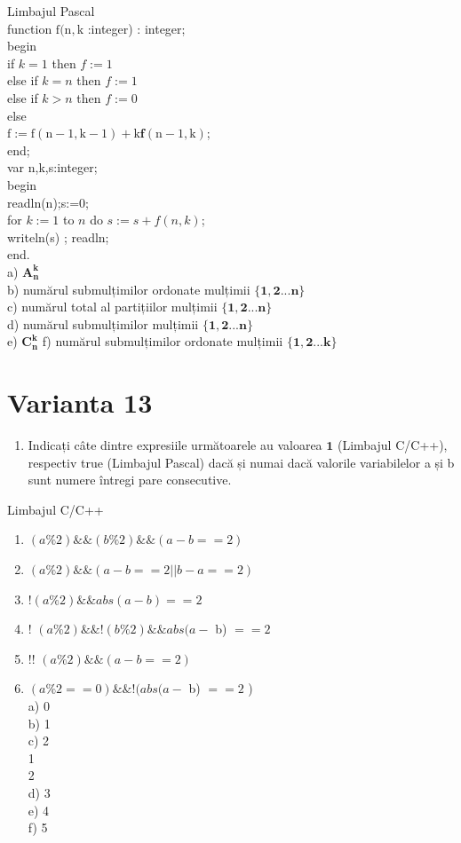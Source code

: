 \documentclass[10pt]{article}
\begin{document}
Limbajul Pascal\\
function $\mathrm{f}(\mathrm{n}, \mathrm{k}$ :integer) : integer;\\
begin\\
if $k=1$ then $f:=1$\\
else if $k=n$ then $f:=1$\\
else if $k>n$ then $f:=0$\\
else\\
$\mathrm{f}:=\mathrm{f}(\mathrm{n}-1, \mathrm{k}-1)+\mathrm{k} \boldsymbol{f}(\mathrm{n}-1, \mathrm{k})$;\\
end;\\
var n,k,s:integer;\\
begin\\
readln(n);s:=0;\\
for $k:=1$ to $n$ do $s:=s+f(n, k)$;\\
writeln(s) ; readln;\\
end.\\
a) $\boldsymbol{A}_{\boldsymbol{n}}^{\boldsymbol{k}}$\\
b) numărul submulțimilor ordonate mulțimii $\{\mathbf{1 , 2 . . . n \}}$\\
c) numărul total al partițiilor mulțimii $\{\mathbf{1 , 2 . . . \mathbf { n } \}}$\\
d) numărul submulțimilor mulțimii $\{\mathbf{1 , 2} . . . \mathbf{n}\}$\\
e) $\boldsymbol{C}_{\boldsymbol{n}}^{\boldsymbol{k}}$ f) numărul submulțimilor ordonate mulțimii $\{\mathbf{1 , 2 . . . k}\}$

\section*{Varianta 13}
\begin{enumerate}
  \item Indicați câte dintre expresiile următoarele au valoarea $\mathbf{1}$ (Limbajul C/C++), respectiv true (Limbajul Pascal) dacă și numai dacă valorile variabilelor a și b sunt numere întregi pare consecutive.
\end{enumerate}

Limbajul C/C++

\begin{enumerate}
  \item $(a \% 2) \& \&(b \% 2) \& \&(a-b==2)$
  \item $(a \% 2) \& \&(a-b==2| | b-a==2)$
  \item $!(a \% 2) \& \& a b s(a-b)==2$
  \item ! $(a \% 2) \& \&!(b \% 2) \& \& a b s(a-$ b) $==2$
  \item !! $(a \% 2) \& \&(a-b==2)$
  \item $(a \% 2==0) \& \&!(a b s(a-$ b) $==2$ )\\
a) 0\\
b) 1\\
c) 2\\
1\\
2\\
d) 3\\
e) 4\\
f) 5
\end{enumerate}
\end{document}

